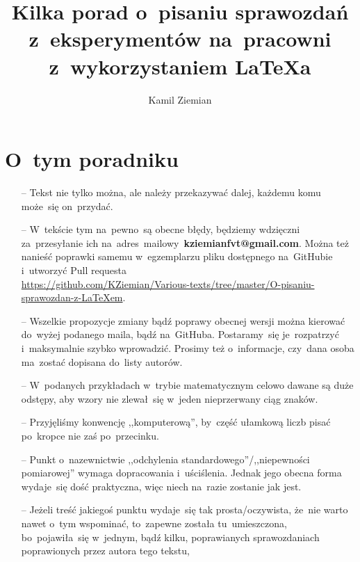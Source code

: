 \documentclass[a4paper,11pt]{article}
\title{Kilka porad o~pisaniu sprawozdań z~eksperymentów na~pracowni
  z~wykorzystaniem \LaTeX a}
\author{Kamil Ziemian}
\newcommand{\tb}{\textbf}
\begin{document}


\maketitle



\section*{O~tym poradniku}
\label{sec:otym}


\begin{itemize}
\item[--] Tekst nie tylko można, ale należy przekazywać dalej, każdemu
  komu może~się on~przydać.
\item[--] W~tekście tym na~pewno~są obecne błędy, będziemy wdzięczni
  za~przesyłanie ich na~adres~mailowy~\tb{kziemianfvt@gmail.com}. Można też
  nanieść poprawki samemu w~egzemplarzu pliku dostępnego na~GitHubie
  i~utworzyć Pull requesta \\
  \href{https://github.com/KZiemian/Various-texts/tree/master/O-pisaniu-sprawozdan-z-LaTeXem}{https://github.com/KZiemian/Various-texts/tree/master/O-pisaniu-sprawozdan-z-LaTeXem}.
\item[--] Wszelkie propozycje zmiany bądź poprawy obecnej wersji można
  kierować do~wyżej podanego maila, bądź na~GitHuba. Postaramy~się
  je~rozpatrzyć i~maksymalnie szybko wprowadzić. Prosimy też
  o~informacje, czy~dana osoba ma~zostać dopisana do~listy autorów.
\item[--] W~podanych przykładach w~trybie matematycznym celowo dawane
  są duże odstępy, aby wzory nie zlewał~się w~jeden nieprzerwany ciąg
  znaków.
\item[--] Przyjęliśmy konwencję ,,komputerową'', by~część ułamkową
  liczb pisać po~kropce nie zaś po~przecinku.
\item[--] Punkt o~nazewnictwie ,,odchylenia
  standardowego''/,,niepewności pomiarowej'' wymaga dopracowania
  i~uściślenia. Jednak jego obecna forma wydaje~się dość praktyczna,
  więc niech na~razie zostanie jak jest.
\item[--] Jeżeli treść jakiegoś punktu wydaje~się tak
  prosta/oczywista, że~nie warto nawet o~tym wspominać, to~zapewne
  została tu~umieszczona, bo~pojawiła~się w~jednym, bądź kilku,
  poprawianych sprawozdaniach poprawionych przez autora tego tekstu,

\end{itemize}
\end{document}
